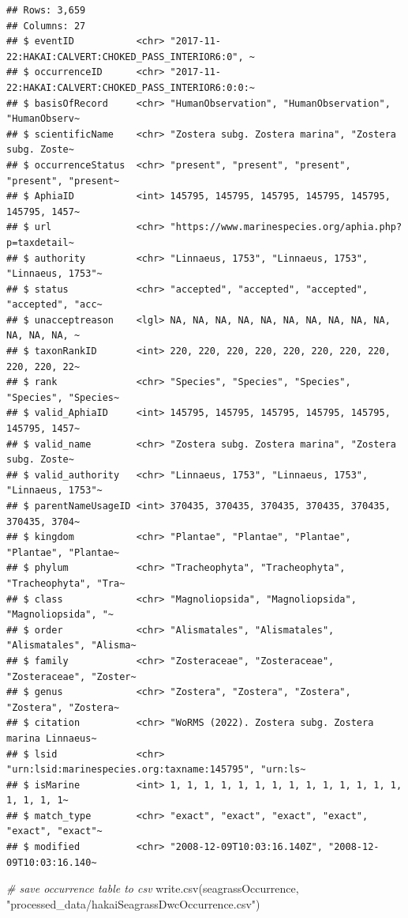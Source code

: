 \documentclass[
]{book}
\newenvironment{Shaded}{\begin{snugshade}}{\end{snugshade}}
\newcommand{\CommentTok}[1]{\textcolor[rgb]{0.56,0.35,0.01}{\textit{#1}}}
\newcommand{\FunctionTok}[1]{\textcolor[rgb]{0.00,0.00,0.00}{#1}}
\newcommand{\NormalTok}[1]{#1}
\newcommand{\StringTok}[1]{\textcolor[rgb]{0.31,0.60,0.02}{#1}}
\begin{document}
\begin{verbatim}
## Rows: 3,659
## Columns: 27
## $ eventID           <chr> "2017-11-22:HAKAI:CALVERT:CHOKED_PASS_INTERIOR6:0", ~
## $ occurrenceID      <chr> "2017-11-22:HAKAI:CALVERT:CHOKED_PASS_INTERIOR6:0:0:~
## $ basisOfRecord     <chr> "HumanObservation", "HumanObservation", "HumanObserv~
## $ scientificName    <chr> "Zostera subg. Zostera marina", "Zostera subg. Zoste~
## $ occurrenceStatus  <chr> "present", "present", "present", "present", "present~
## $ AphiaID           <int> 145795, 145795, 145795, 145795, 145795, 145795, 1457~
## $ url               <chr> "https://www.marinespecies.org/aphia.php?p=taxdetail~
## $ authority         <chr> "Linnaeus, 1753", "Linnaeus, 1753", "Linnaeus, 1753"~
## $ status            <chr> "accepted", "accepted", "accepted", "accepted", "acc~
## $ unacceptreason    <lgl> NA, NA, NA, NA, NA, NA, NA, NA, NA, NA, NA, NA, NA, ~
## $ taxonRankID       <int> 220, 220, 220, 220, 220, 220, 220, 220, 220, 220, 22~
## $ rank              <chr> "Species", "Species", "Species", "Species", "Species~
## $ valid_AphiaID     <int> 145795, 145795, 145795, 145795, 145795, 145795, 1457~
## $ valid_name        <chr> "Zostera subg. Zostera marina", "Zostera subg. Zoste~
## $ valid_authority   <chr> "Linnaeus, 1753", "Linnaeus, 1753", "Linnaeus, 1753"~
## $ parentNameUsageID <int> 370435, 370435, 370435, 370435, 370435, 370435, 3704~
## $ kingdom           <chr> "Plantae", "Plantae", "Plantae", "Plantae", "Plantae~
## $ phylum            <chr> "Tracheophyta", "Tracheophyta", "Tracheophyta", "Tra~
## $ class             <chr> "Magnoliopsida", "Magnoliopsida", "Magnoliopsida", "~
## $ order             <chr> "Alismatales", "Alismatales", "Alismatales", "Alisma~
## $ family            <chr> "Zosteraceae", "Zosteraceae", "Zosteraceae", "Zoster~
## $ genus             <chr> "Zostera", "Zostera", "Zostera", "Zostera", "Zostera~
## $ citation          <chr> "WoRMS (2022). Zostera subg. Zostera marina Linnaeus~
## $ lsid              <chr> "urn:lsid:marinespecies.org:taxname:145795", "urn:ls~
## $ isMarine          <int> 1, 1, 1, 1, 1, 1, 1, 1, 1, 1, 1, 1, 1, 1, 1, 1, 1, 1~
## $ match_type        <chr> "exact", "exact", "exact", "exact", "exact", "exact"~
## $ modified          <chr> "2008-12-09T10:03:16.140Z", "2008-12-09T10:03:16.140~
\end{verbatim}

\begin{Shaded}
\begin{Highlighting}[]
\CommentTok{\# save occurrence table to csv}
\FunctionTok{write.csv}\NormalTok{(seagrassOccurrence, }\StringTok{"processed\_data/hakaiSeagrassDwcOccurrence.csv"}\NormalTok{)}
\end{Highlighting}
\end{Shaded}
\end{document}
